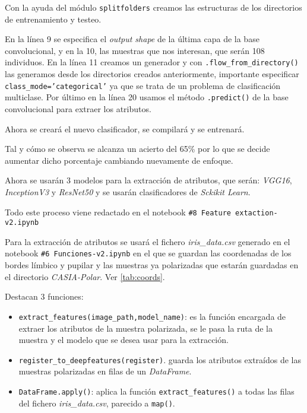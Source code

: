 Con la ayuda del módulo \texttt{splitfolders} creamos las estructuras de los directorios de entrenamiento y testeo.

En la línea 9 se especifica el \emph{output shape} de la última capa de la base convolucional, y en la 10, las muestras que nos interesan, que serán 108 individuos.
En la línea 11 creamos un generador y con \texttt{.flow\_from\_directory()} las generamos desde los directorios creados anteriormente, importante especificar \texttt{class\_mode='categorical'} ya que se trata de un problema de clasificación multiclase. Por último en la línea 20 usamos el método \texttt{.predict()} de la base convolucional para extraer los atributos.

Ahora se creará el nuevo clasificador, se compilará y se entrenará.


Tal y cómo se observa se alcanza un acierto del 65\% por lo que se decide aumentar dicho porcentaje cambiando nuevamente de enfoque.

Ahora se usarán 3 modelos  para la extracción de atributos, que serán: \emph{VGG16}, \emph{InceptionV3} y \emph{ResNet50} y se usarán clasificadores de \emph{Sckikit Learn}.

Todo este proceso viene redactado en el notebook \texttt{\#8 Feature extaction-v2.ipynb}


Para la extracción de atributos se usará el fichero \emph{iris\_data.csv} generado en el notebook \texttt{\#6 Funciones-v2.ipynb} en el que se guardan las coordenadas de los bordes límbico y pupilar y las muestras ya polarizadas que estarán guardadas en el directorio \emph{CASIA-Polar}. Ver \ref{tab:coords}.

Destacan 3 funciones:
\begin{itemize}
    \item \texttt{extract\_features(image\_path,model\_name)}: es la función encargada de extraer los atributos de la muestra polarizada, se le pasa la ruta de la muestra y el modelo que se desea usar para la extracción.
    \item\texttt{register\_to\_deepfeatures(register)}. guarda los atributos extraídos de las muestras polarizadas en filas de un \emph{DataFrame}.
    \item\texttt{DataFrame.apply()}: aplica la función \texttt{extract\_features()} a todas las filas del fichero \emph{iris\_data.csv}, parecido a \texttt{map()}.
\end{itemize}

